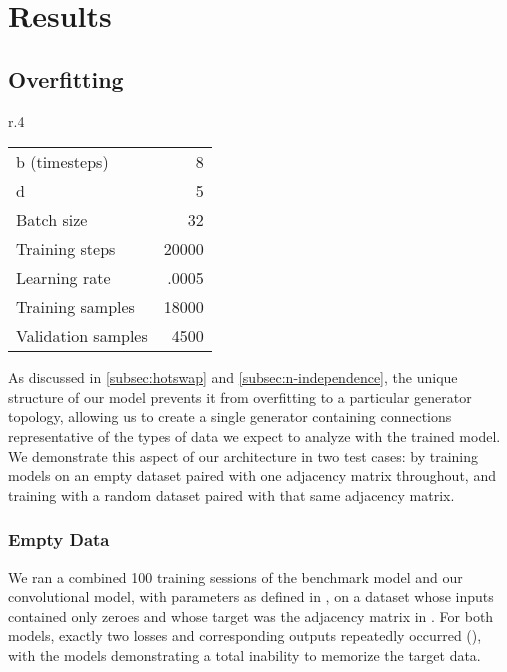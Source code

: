 \graphicspath{ {resources/models/} } 

\chapter{Results}
\label{results}
\section{Overfitting}
\label{sec:overfitting}
\setlength{\columnsep}{20pt}
\begin{wraptable}[8]{r}{.4\textwidth}
	\captionsetup{justification=centering}
	\vspace{-20pt}
	\begin{tabular}{lr}
		b (timesteps) & 8\\
		d& 5\\
		Batch size& 32\\
		Training steps& 20000\\
		Learning rate& .0005\\
		Training samples& 18000\\
		Validation samples& 4500
	\end{tabular}
	\vspace{-5pt}
	\label{fig:nullparams}
\end{wraptable}
As discussed in \ref{subsec:hotswap} and \ref{subsec:n-independence}, the unique 
structure of our model prevents it from overfitting to a particular generator 
topology, allowing us to create a single generator containing connections 
representative of the types of data we expect to analyze with the trained model.
We demonstrate this aspect of our architecture in two test cases: by training 
models on an empty dataset paired with one adjacency matrix throughout, and 
training with a random dataset paired with that same adjacency matrix.

\subsection{Empty Data}
\label{subsec:empty}
We ran a combined 100 training sessions of the benchmark model and our 
convolutional model, with parameters as defined in , on a 
dataset whose inputs contained only zeroes and whose target was the adjacency 
matrix in . For both models, exactly two losses 
and corresponding outputs repeatedly occurred (), with 
the models demonstrating a total inability to memorize the target data.

